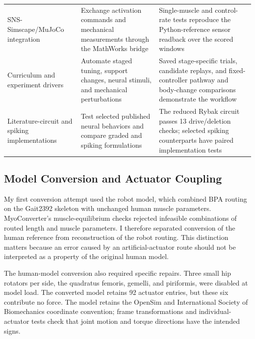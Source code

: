 \begin{table}[htbp]
\begin{tabularx}{\textwidth}{@{}>{\raggedright\arraybackslash}p{}*{2}{>{\raggedright\arraybackslash}X}@{}}
SNS-Simscape/MuJoCo integration & Exchange activation commands and mechanical measurements through the MathWorks bridge & Single-muscle and control-rate tests reproduce the Python-reference sensor readback over the scored windows \\
Curriculum and experiment drivers & Automate staged tuning, support changes, neural stimuli, and mechanical perturbations & Saved stage-specific trials, candidate replays, and fixed-controller pathway and body-change comparisons demonstrate the workflow \\
Literature-circuit and spiking implementations & Test selected published neural behaviors and compare graded and spiking formulations & The reduced Rybak circuit passes 13 drive/deletion checks; selected spiking counterparts have paired implementation tests \\
\bottomrule
\end{tabularx}
\end{table}

\subsection{Model Conversion and Actuator Coupling}\label{sec:sns_existing_tools}

My first conversion attempt used the robot model, which combined BPA routing on the Gait2392 skeleton with unchanged human muscle parameters. MyoConverter's muscle-equilibrium checks rejected infeasible combinations of routed length and muscle parameters. I therefore separated conversion of the human reference from reconstruction of the robot routing. This distinction matters because an error caused by an artificial-actuator route should not be interpreted as a property of the original human model.

The human-model conversion also required specific repairs. Three small hip rotators per side, the quadratus femoris, gemelli, and piriformis, were disabled at model load. The converted model retains 92 actuator entries, but these six contribute no force. The model retains the OpenSim and International Society of Biomechanics coordinate convention; frame transformations and individual-actuator tests check that joint motion and torque directions have the intended signs.

